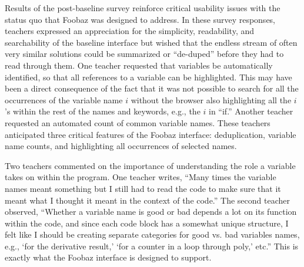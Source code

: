 \documentclass[12pt,twoside]{mitthesis}
\providecommand{\DIFaddtex}[1]{{\protect\color{blue}\uwave{#1}}} %
\providecommand{\DIFdeltex}[1]{{\protect\color{red}\sout{#1}}}                      %
\providecommand{\DIFaddbegin}{} %
\providecommand{\DIFaddend}{} %
\providecommand{\DIFdelbegin}{} %
\providecommand{\DIFdelend}{} %
\providecommand{\DIFadd}[1]{\texorpdfstring{\DIFaddtex{#1}}{#1}} %
\providecommand{\DIFdel}[1]{\texorpdfstring{\DIFdeltex{#1}}{}} %
\begin{document}
Results of the post-baseline survey reinforce critical usability issues with the status quo that Foobaz was designed to address. In these survey responses, teachers expressed an appreciation for the simplicity, readability, and searchability of the baseline interface but wished that the endless stream of often very similar solutions could be summarized or ``de-duped'' before they had to read through them. One teacher requested that variables be automatically identified, so that all references to a variable can be highlighted. This may have been a direct consequence of the fact that it was not possible to search for all the occurrences of the variable name \DIFdelbegin \DIFdel{$i$ }\DIFdelend \DIFaddbegin \texttt{\DIFadd{i}} \DIFaddend without the browser also highlighting all the \DIFdelbegin \DIFdel{$i$}\DIFdelend \DIFaddbegin \texttt{\DIFadd{i}}\DIFaddend 's within the rest of the names and keywords, e.g., the \DIFdelbegin \DIFdel{$i$ }\DIFdelend \DIFaddbegin \texttt{\DIFadd{i}} \DIFaddend in ``if.'' Another teacher requested an automated count of common variable names. These teachers anticipated three critical features of the Foobaz interface: deduplication, variable name counts, and highlighting all occurrences of selected names.

Two teachers commented on the importance of understanding the role a variable takes on within the program. One teacher writes, ``Many times the variable names meant something but I still had to read the code to make sure that it meant what I thought it meant in the context of the code.'' The second teacher observed, ``Whether a variable name is good or bad depends a lot on its function within the code, and since each code block has a somewhat unique structure, I felt like I should be creating separate categories for good vs. bad variables names, e.g., `for the derivative result,' `for a counter in a loop through poly,' etc.'' This is exactly what the Foobaz interface is designed to support. 
\end{document}
